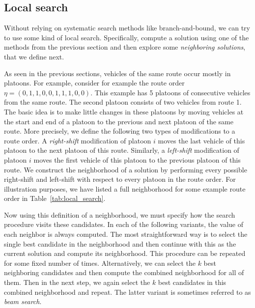 \documentclass[a4paper]{article}
\theoremstyle{definition}
\theoremstyle{plain}
\begin{document}
\subsection{Local search}
\label{sec:local_search}

Without relying on systematic search methods like branch-and-bound, we can try
to use some kind of local search. Specifically, compute a solution using one of
the methods from the previous section and then explore some \textit{neighboring
  solutions}, that we define next.

As seen in the previous sections, vehicles of the same route occur mostly in
platoons. For example, consider for example the route order
$\eta = (0, 1, 1, 0, 0, 1, 1, 1, 0, 0)$. This example has 5 platoons of consecutive
vehicles from the same route. The second platoon consists of two vehicles from
route 1.
The basic idea is to make little changes in these platoons by moving vehicles at
the start and end of a platoon to the previous and next platoon of the same
route.
%
More precisely, we define the following two types of modifications to a route
order. A \textit{right-shift} modification of platoon $i$ moves the last vehicle of this
platoon to the next platoon of this route. Similarly, a \textit{left-shift} modification
of platoon $i$ moves the first vehicle of this platoon to the previous platoon
of this route.
%
We construct the neighborhood of a solution by performing every possible
right-shift and left-shift with respect to every platoon in the route order. For
illustration purposes, we have listed a full neighborhood for some example route
order in Table~\ref{tab:local_search}.

Now using this definition of a neighborhood, we must specify how the search
procedure visits these candidates.
In each of the following variants, the value of each neighbor is always computed.
%
The most straightforward way is to select the single best candidate in the
neighborhood and then continue with this as the current solution and compute its
neighborhood. This procedure can be repeated for some fixed number of times.
Alternatively, we can select the $k$ best neighboring candidates and then
compute the combined neighborhood for all of them. Then in the next step, we
again select the $k$ best candidates in this combined neighborhood and repeat.
The latter variant is sometimes referred to as \textit{beam search}.

\newcommand*{\1}{{\color{blue}1}}%
\newcommand*{\0}{{\color{red}0}}%
\end{document}
